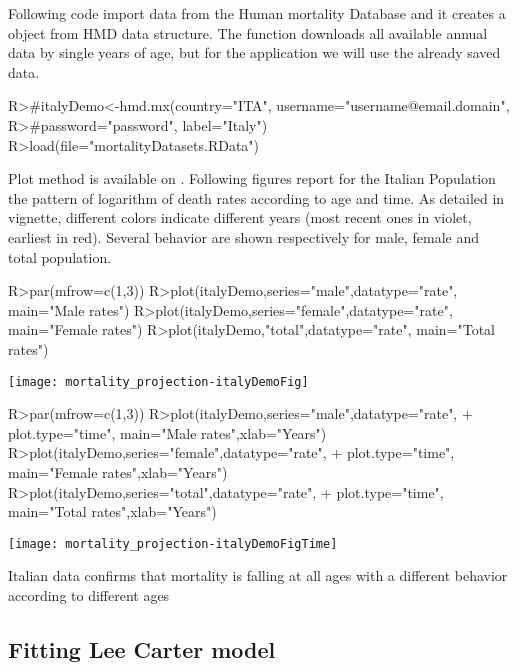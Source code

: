 \documentclass[nojss]{jss}
\begin{document}
Following code import data from the Human mortality Database and it creates a  object from HMD data structure.
The  function downloads all available annual data by single years of age, but for the application we will use the already saved data.

\begin{Schunk}
\begin{Sinput}
R>#italyDemo<-hmd.mx(country="ITA", username="username@email.domain", 
R>#password="password", label="Italy")
R>load(file="mortalityDatasets.RData")
\end{Sinput}
\end{Schunk}

Plot method is available on . Following figures report for the Italian Population the pattern of logarithm of death rates according to age and time. As detailed in  vignette, different colors indicate different years (most recent ones in violet, earliest in red). Several behavior are shown respectively for male, female and total population. 

\begin{Schunk}
\begin{Sinput}
R>par(mfrow=c(1,3))
R>plot(italyDemo,series="male",datatype="rate", main="Male rates")
R>plot(italyDemo,series="female",datatype="rate", main="Female rates")
R>plot(italyDemo,"total",datatype="rate", main="Total rates")
\end{Sinput}
\end{Schunk}
\texttt{[image: mortality\_projection-italyDemoFig]}
\begin{Schunk}
\begin{Sinput}
R>par(mfrow=c(1,3))
R>plot(italyDemo,series="male",datatype="rate",
+      plot.type="time", main="Male rates",xlab="Years")
R>plot(italyDemo,series="female",datatype="rate",
+      plot.type="time", main="Female rates",xlab="Years")
R>plot(italyDemo,series="total",datatype="rate",
+      plot.type="time", main="Total rates",xlab="Years")
\end{Sinput}
\end{Schunk}
\texttt{[image: mortality\_projection-italyDemoFigTime]}

Italian data confirms that mortality is falling at all ages with a different behavior according to different ages

\subsection{Fitting Lee Carter model} 
\end{document}
